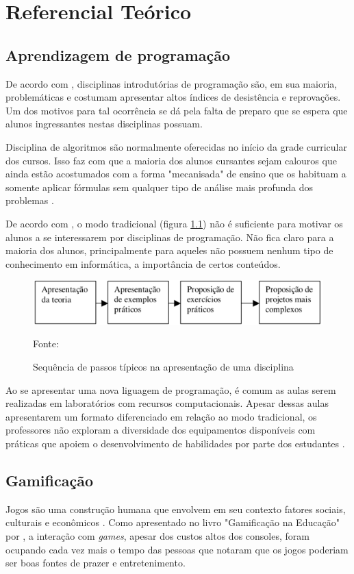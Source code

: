 \chapter[Referencial Teórico]{Referencial Teórico}

\section{Aprendizagem de programação}
De acordo com , disciplinas introdutórias de programação são, em sua maioria, problemáticas e costumam apresentar
altos índices de desistência e reprovações. Um dos motivos para tal ocorrência se dá pela falta de preparo que se espera que alunos
ingressantes nestas disciplinas possuam.

Disciplina de algoritmos são normalmente oferecidas no início da grade curricular dos cursos. Isso faz com que a maioria dos alunos
cursantes sejam calouros que ainda estão acostumados com a forma "mecanisada" de ensino que os habituam a somente aplicar fórmulas 
sem qualquer tipo de análise mais profunda dos problemas \cite{KOLIVER}.

De acordo com , o modo tradicional (figura \ref{figura4}) não é suficiente para motivar os alunos a se
interessarem por disciplinas de programação. Não fica claro para a maioria dos alunos, principalmente para aqueles
não possuem nenhum tipo de conhecimento em informática, a importância de certos conteúdos.

\begin{figure}[h]
	\centering
	\includegraphics[keepaspectratio=true,scale=0.34]{figuras/modoTradicional.png}
	\caption{Sequência de passos típicos na apresentação de uma disciplina}
	Fonte: \cite{Borges}
	\label{figura4}
\end{figure}

Ao se apresentar uma nova liguagem de programação, é comum as aulas serem realizadas em laboratórios com
recursos computacionais. Apesar dessas aulas apresentarem um formato diferenciado em relação ao modo tradicional,
os professores não exploram a diversidade dos equipamentos disponíveis com práticas que apoiem o desenvolvimento 
de habilidades por parte dos estudantes \cite{Borges}.

\section{Gamificação}
Jogos são uma construção humana que envolvem em seu contexto fatores sociais, culturais e econômicos \cite{EaDF440}.
Como apresentado no livro "Gamificação na Educação" por , a interação com \textit{games}, apesar
dos custos altos dos consoles, foram ocupando cada vez mais o tempo das pessoas que notaram que os jogos poderiam ser boas fontes
de prazer e entretenimento.

